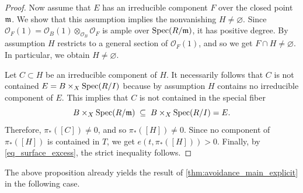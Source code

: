 \documentclass[a4paper, 11pt]{amsart}
\newcommand{\mm}{{\normalfont\mathfrak{m}}}
\newcommand{\OO}{\mathscr{O}}
\newcommand{\Spec}{\normalfont\text{Spec}}
\theoremstyle{definition}
\begin{document}
\begin{proof}
		Now assume that $E$ has an irreducible component $F$ over the closed point $\mm$.
		We show that this assumption implies the nonvanishing $H\neq \varnothing$.
		Since $\OO_F(1) = \OO_B(1) \otimes_{\OO_B} \OO_F$ is ample over $\Spec(R/\mm)$, it has positive degree. 
		By assumption $H$ restricts to a general section of $\OO_F(1)$, and so we get $F \cap H \neq \varnothing$.
		In particular, we obtain $H\neq \varnothing$.
		
		Let $C \subset H$ be an irreducible component of $H$.
		It necessarily follows that $C$ is not contained $E = B \times_X \Spec(R/I)$ because by assumption $H$ contains no irreducible component of $E$. 
		This implies that $C$ is not contained in the special fiber 
		$$
		B \times_{X} \Spec(R/\mm) \;\subseteq\; B \times_{X} \Spec(R/I) = E.
		$$
		Therefore, $\pi_*\left(\left[C\right]\right) \neq 0$, and so $\pi_*\left(\left[H\right]\right) \neq 0$. 
		Since no component of $\pi_*
		\left(\left[H\right]\right)$ is contained in $T$, we get
		$e\left(t, \pi_*\left(\left[H\right]\right)\right) > 0$.
		Finally, by \autoref{eq_surface_excess}, the strict inequality follows. 
	\end{proof}
	
	The above proposition already yields the result of \autoref{thm:avoidance_main_explicit} in the following case. 
	
\end{document}
